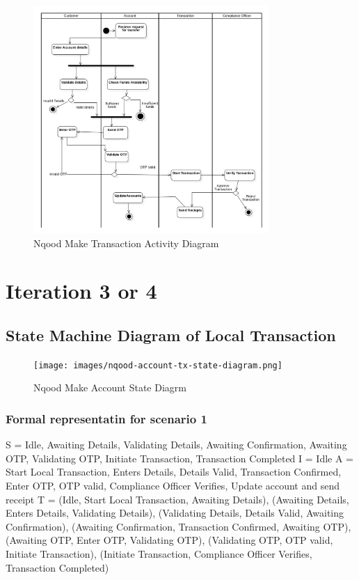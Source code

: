 \documentclass[a4paper]{report}
\begin{document}
\begin{figure}[h!]
    \centering
    \includegraphics[width=0.8\textwidth]{images/nqood-make-tx-activity-diagram.png}
    \caption{Nqood Make Transaction Activity Diagram}
    \label{fig:nqood-make-transaction-activity-diagram}
\end{figure}

\chapter{Iteration 3 or 4}

\section{State Machine Diagram of Local Transaction}

\begin{figure}[h!]
    \centering
    \texttt{[image: images/nqood-account-tx-state-diagram.png]}
    \caption{Nqood Make Account State Diagrm}
    \label{fig:nqood-make-account-state-diagram2}
\end{figure}

\subsection{Formal representatin for scenario 1}

S = {Idle, Awaiting Details,  Validating Details, Awaiting Confirmation, Awaiting OTP, Validating OTP, Initiate Transaction, Transaction Completed}
\newline
I = {Idle}
\newline
A = {Start Local Transaction, Enters Details, Details Valid, Transaction Confirmed, Enter OTP, OTP valid, Compliance Officer Verifies, Update account and send receipt}
\newline
T = {(Idle, Start Local Transaction, Awaiting Details), (Awaiting Details, Enters Details, Validating Details), (Validating Details, Details Valid, Awaiting Confirmation), (Awaiting Confirmation, Transaction Confirmed, Awaiting OTP), (Awaiting OTP, Enter OTP, Validating OTP), (Validating OTP, OTP valid, Initiate Transaction), (Initiate Transaction, Compliance Officer Verifies, Transaction Completed)}
\newline
\end{document}
